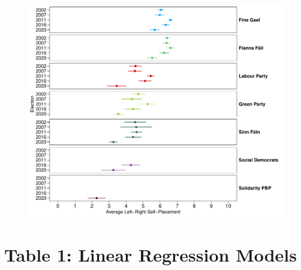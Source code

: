 \documentclass[12pt,letterpaper]{article}
\begin{document}
\begin{figure}
	\centering
	\includegraphics[width=1\linewidth]{fig_02}
	\label{figure 2}
\end{figure}


\newpage
\section*{Table 1: Linear Regression Models} 
\vspace{.25cm}
\end{document}
